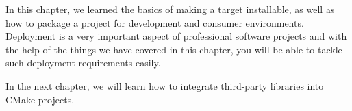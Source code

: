 In this chapter, we learned the basics of making a target installable, as well as how to package a project for development and consumer environments. Deployment is a very important aspect of professional software projects and with the help of the things we have covered in this chapter, you will be able to tackle such deployment requirements easily.

In the next chapter, we will learn how to integrate third-party libraries into CMake projects.
